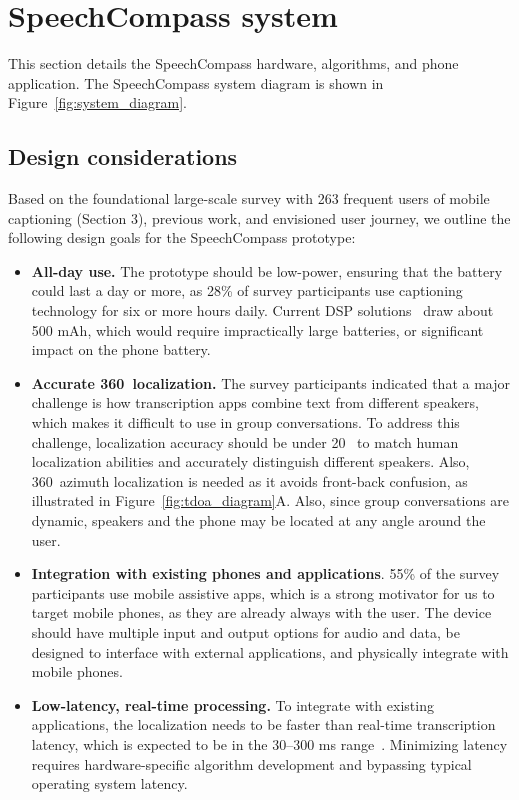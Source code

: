 \section{SpeechCompass system} 
This section details the SpeechCompass hardware, algorithms, and phone application. The SpeechCompass system diagram is shown in Figure~\ref{fig:system_diagram}.
\subsection{Design considerations}
Based on the foundational large-scale survey with 263 frequent users of mobile captioning (Section 3), previous work, 
and envisioned user journey, we outline the following design goals for the SpeechCompass prototype:
\begin{itemize}
    \item \textbf{All-day use.}
    The prototype should be low-power, ensuring that the battery could last a day or more, as 28\% of survey participants use captioning technology for six or more hours daily. Current DSP solutions~\cite{grondin2019lightweight, MiniDSP} draw about 500 mAh, which would require impractically large batteries, or significant impact on the phone battery.
    
    \item \textbf{Accurate 360\textdegree~localization.} The survey participants indicated that a major challenge is how transcription apps combine text from different speakers, which makes it difficult to use in group conversations. To address this challenge, localization accuracy should be under 20\textdegree~\cite{human_localization_error} to match human localization abilities and accurately distinguish different speakers. Also, 360\textdegree~azimuth localization is needed as it avoids front-back confusion, as illustrated in Figure~\ref{fig:tdoa_diagram}A. Also, since group conversations are dynamic, speakers and the phone may be located at any angle around the user.
    
    \item \textbf{Integration with existing phones and applications}. 55\% of the survey participants use mobile assistive apps, which is a strong motivator for us to target mobile phones, as they are already always with the user. The device should have multiple input and output options for audio and data, be designed to interface with external applications, and physically integrate with mobile phones. 
    
    \item\textbf{Low-latency, real-time processing.} To integrate with existing applications, the localization needs to be faster than real-time transcription latency, which is expected to be in the 30--300 ms range~\cite{yu2021fastemit}. Minimizing latency requires hardware-specific algorithm development and bypassing typical operating system latency. 
\end{itemize}

